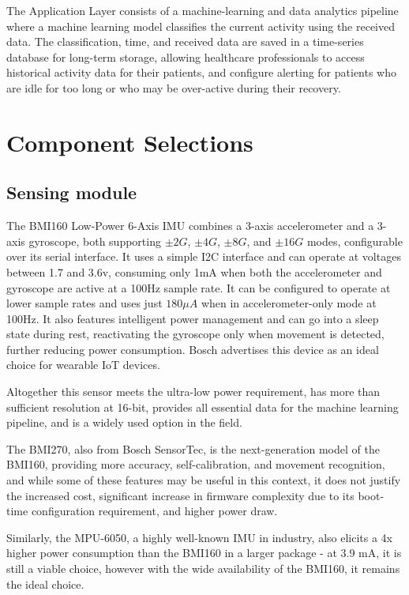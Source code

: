\documentclass[conference]{IEEEtran}
\begin{document}
The Application Layer consists of a machine-learning and data analytics pipeline where a machine learning model classifies the current activity using the received data. The classification, time, and received data are saved in a time-series database for long-term storage, allowing healthcare professionals to access historical activity data for their patients, and configure alerting for patients who are idle for too long or who may be over-active during their recovery.

\section{Component Selections}\label{components}

\subsection{Sensing module}
The BMI160 Low-Power 6-Axis IMU\cite{BMI160} combines a 3-axis accelerometer and a 3-axis gyroscope, both supporting $\pm2G$, $\pm4G$, $\pm8G$, and $\pm16G$ modes, configurable over its serial interface. It uses a simple I2C interface and can operate at voltages between 1.7 and 3.6v, consuming only 1mA when both the accelerometer and gyroscope are active at a 100Hz sample rate. It can be configured to operate at lower sample rates and uses just $180\mu A$ when in accelerometer-only mode at 100Hz. It also features intelligent power management and can go into a sleep state during rest, reactivating the gyroscope only when movement is detected, further reducing power consumption. Bosch advertises this device as an ideal choice for wearable IoT devices.

Altogether this sensor meets the ultra-low power requirement, has more than sufficient resolution at 16-bit, provides all essential data for the machine learning pipeline, and is a widely used option in the field.

The BMI270, also from Bosch SensorTec, is the next-generation model of the BMI160, providing more accuracy, self-calibration, and movement recognition, and while some of these features may be useful in this context, it does not justify the increased cost, significant increase in firmware complexity due to its boot-time configuration requirement, and higher power draw.

Similarly, the MPU-6050, a highly well-known IMU in industry, also elicits a 4x higher power consumption than the BMI160 in a larger package - at 3.9 mA, it is still a viable choice, however with the wide availability of the BMI160, it remains the ideal choice.
\end{document}
